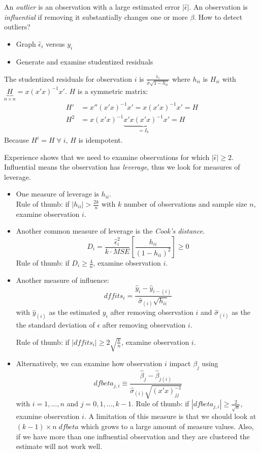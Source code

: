 		An \emph{outlier} is an observation with a large estimated error $|\hat{\epsilon}|$. An observation is \emph{influential} if removing it substantially changes one or more $\beta$. How to detect outliers?
		\begin{itemize}
			\item Graph $\hat{\epsilon}_i$ versus $y_i$
			\item Generate and examine studentized residuals
		\end{itemize}
		The studentized residuals for observation $i$ is $\frac{\hat{\epsilon}_i}{\hat{\sigma}\sqrt{1-h_{ii}}}$ where $h_{ii}$ is $H_{ii}$ with $\underbrace{H}_{n \times n}=x(x'x)^{-1}x'$. $H$ is a symmetric matrix:
		\begin{align*}
			H'&=x''(x'x)^{-1}x'=x(x'x)^{-1}x'=H\\
			H^2&=x(x'x)^{-1}\underbrace{x'x(x'x)^{-1}}_{=I_k}x'=H
		\end{align*}
		Because $H^i=H\;\forall\;i$, $H$ is idempotent.
		
		Experience shows that we need to examine observations for which $|\hat{\epsilon}|\geq 2$. Influential means the observation has \emph{leverage}, thus we look for measures of leverage.
		\begin{itemize}
			\item One measure of leverage is $h_{ii}$.\\
				Rule of thumb: if $|h_{ii}|>\frac{2k}{n}$ with $k$ number of observations and sample size $n$, examine observation $i$.
			\item Another common measure of leverage is the \emph{Cook's distance}.\\
				\begin{equation*}
					D_i=\frac{\hat{\epsilon}^2_i}{k\cdot MSE}\left[\frac{h_{ii}}{(1-h_{ii})^2}\right]\geq 0
				\end{equation*}
				Rule of thumb: if $D_i \geq \frac{4}{n}$, examine observation $i$.
			\item Another measure of influence:
				\begin{equation*}
					dffits_i=\frac{\hat{y}_i-\hat{y}_{i-(i)}}{\hat{\sigma}_{(i)}\sqrt{h_{ii}}}
				\end{equation*}
				with $\hat{y}_{(i)}$ as the estimated $y_i$ after removing observation $i$ and $\hat{\sigma}_{(i)}$ as the the standard deviation of $\epsilon$ after removing observation $i$.

				Rule of thumb: if $|dffits_i|\geq 2 \sqrt{\frac{k}{n}}$, examine observation $i$.
			\item Alternatively, we can examine how observation $i$ impact $\beta_j$ using
				\begin{equation*}
					dfbeta_{j,i}\equiv \frac{\hat{\beta}_j-\hat{\beta}_{j(i)}}{\hat{\sigma}_{(i)}\sqrt{(x'x)^{-1}_{jj}}}
				\end{equation*}
				with $i=1,...,n$ and $j=0,1,...,k-1$.
				Rule of thumb: if $|dfbeta_{j,i}|\geq \frac{2}{\sqrt{n}}$, examine observation $i$. A limitation of this measure is that we should look at $(k-1)\times n\;dfbeta$ which grows to a large amount of measure values.	Also, if we have more than one influential observation and they are clustered the estimate will not work well.	
		\end{itemize}
